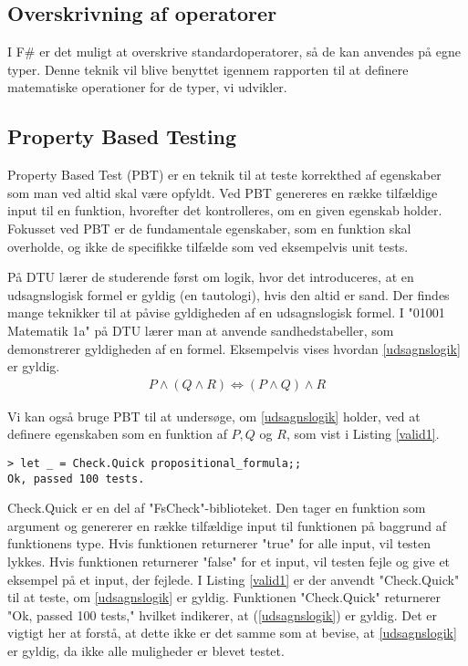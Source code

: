\subsection{Overskrivning af operatorer}
I F\# er det muligt at overskrive standardoperatorer, så de kan anvendes på egne typer. Denne teknik vil blive benyttet igennem rapporten til at definere matematiske operationer for de typer, vi udvikler.

\subsection{Property Based Testing}
Property Based Test (PBT) er en teknik til at teste korrekthed af egenskaber som man ved altid skal være opfyldt. Ved PBT genereres en række tilfældige input til en funktion, hvorefter det kontrolleres, om en given egenskab holder. Fokusset ved PBT er de fundamentale egenskaber, som en funktion skal overholde, og ikke de specifikke tilfælde som ved eksempelvis unit tests.

På DTU lærer de studerende først om logik, hvor det introduceres, at en udsagnslogisk formel er gyldig (en tautologi), hvis den altid er sand. Der findes mange teknikker til at påvise gyldigheden af en udsagnslogisk formel. I "01001 Matematik 1a" på DTU lærer man at anvende sandhedstabeller, som demonstrerer gyldigheden af en formel. Eksempelvis vises hvordan \eqref{udsagnslogik} er gyldig.
\begin{gather}
    P \land (Q \land R) \iff (P \land Q) \land R
    \label{udsagnslogik}
\end{gather}

Vi kan også bruge PBT til at undersøge, om \eqref{udsagnslogik} holder, ved at definere egenskaben som en funktion af $P, Q$ og $R$, som vist i Listing \ref{valid1}.



\begin{lstlisting}[style=output, label={lst:output_example}, caption={Output ved PBT af (\ref{udsagnslogik})}]
> let _ = Check.Quick propositional_formula;;
Ok, passed 100 tests.
\end{lstlisting}

Check.Quick er en del af "FsCheck"-biblioteket. Den tager en funktion som argument og genererer en række tilfældige input til funktionen på baggrund af funktionens type. Hvis funktionen returnerer "true" for alle input, vil testen lykkes. Hvis funktionen returnerer "false" for et input, vil testen fejle og give et eksempel på et input, der fejlede. I Listing \ref{valid1} er der anvendt "Check.Quick" til at teste, om \eqref{udsagnslogik} er gyldig. Funktionen "Check.Quick" returnerer "Ok, passed 100 tests," hvilket indikerer, at (\ref{udsagnslogik}) er gyldig. Det er vigtigt her at forstå, at dette ikke er det samme som at bevise, at \eqref{udsagnslogik} er gyldig, da ikke alle muligheder er blevet testet.

